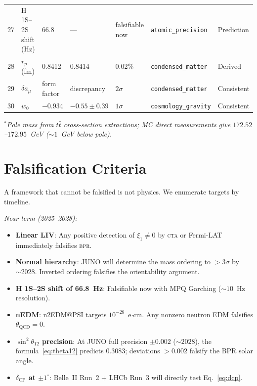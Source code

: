 \documentclass[aps,prd,twocolumn,superscriptaddress,longbibliography,nofootinbib]{revtex4-2}
\newcommand{\bpr}{\textsc{bpr}}
\begin{document}
\begin{table}[t]
\begin{ruledtabular}
\begin{tabular}{rllllll}
27 & H 1S--2S shift (Hz) & 66.8 & --- & falsifiable now & \texttt{atomic\_precision} & Prediction \\
28 & $r_p$ (fm) & 0.8412 & 0.8414 & 0.02\% & \texttt{condensed\_matter} & Derived \\
29 & $\delta a_\mu$ & form factor & discrepancy & $2\sigma$ & \texttt{condensed\_matter} & Consistent \\
30 & $w_0$ & $-0.934$ & $-0.55\pm0.39$ & $1\sigma$ & \texttt{cosmology\_gravity} & Consistent \\
\end{tabular}
\end{ruledtabular}
\textit{$^*$Pole mass from $t\bar{t}$ cross-section extractions;
MC direct measurements give $172.52$--$172.95$~GeV ($\sim 1$~GeV below pole).}
\end{table}


\section{Falsification Criteria}
\label{sec:falsification}

A framework that cannot be falsified is not physics.  We enumerate targets
by timeline.

\textit{Near-term (2025--2028):}
\begin{itemize}
\item \textbf{Linear LIV}: Any positive detection of $\xi_1 \neq 0$ by
  \textsc{cta} or Fermi-LAT immediately falsifies \bpr.
\item \textbf{Normal hierarchy}: JUNO will determine the mass ordering
  to $> 3\sigma$ by $\sim 2028$.  Inverted ordering falsifies the
  orientability argument.
\item \textbf{H 1S--2S shift of 66.8~Hz}: Falsifiable now with
  MPQ Garching ($\sim 10$~Hz resolution).
\item \textbf{nEDM}: n2EDM@PSI targets $10^{-28}$~e$\cdot$cm.  Any
  nonzero neutron EDM falsifies $\theta_{\mathrm{QCD}} = 0$.
\item \textbf{$\sin^2\theta_{12}$ precision}: At JUNO full precision
  $\pm 0.002$ ($\sim 2028$), the formula~\eqref{eq:theta12} predicts
  $0.3083$; deviations $> 0.002$ falsify the BPR solar angle.
\item \textbf{$\delta_{\mathrm{CP}}$ at $\pm 1^\circ$}: Belle~II Run~2
  + LHCb Run~3 will directly test Eq.~\eqref{eq:dcp}.
\end{itemize}
\end{document}
